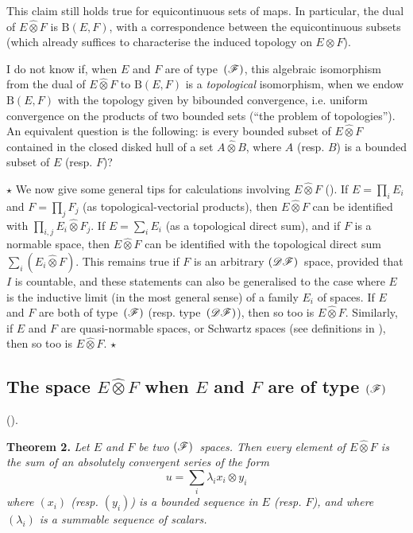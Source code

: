 \documentclass{article}
\theoremstyle{plain}
\newenvironment{itenv}[1]
  {\phantomsection\par\medskip\noindent\textbf{#1.}\itshape}
  {\medskip}
\newcommand{\aster}[1]{$\star${#1}$\star$}
\newcommand{\BB}{\mathrm{B}}
\newcommand{\DF}{\mbox{\normalfont($\mathscr{DF}$)}}
\newcommand{\FF}{\mbox{\normalfont($\mathscr{F}$)}}
\newcommand{\hotimes}{\widehat{\otimes}}
\newcommand{\oldpage}[1]{\marginpar{\footnotesize$\Big\vert$ \textit{p.~#1}}}
\begin{document}
This claim still holds true for equicontinuous sets of maps.
In particular, the dual of $E\hotimes F$ is $\BB(E,F)$, with a correspondence between the equicontinuous subsets (which already suffices to characterise the induced topology on $E\otimes F$).

I do not know if, when $E$ and $F$ are of type~$\FF$, this algebraic isomorphism from the dual of $E\hotimes F$ to $\BB(E,F)$ is a \emph{topological} isomorphism, when we endow $\BB(E,F)$ with the topology given by bibounded convergence, i.e. uniform convergence on the products of two bounded sets (``the problem of topologies'').
An equivalent question is the following:
is every bounded subset of $E\hotimes F$ contained in the closed disked hull of a set $A\hotimes B$, where $A$ (resp. $B$) is a bounded subset of $E$ (resp. $F$)?

\aster{
  We now give some general tips for calculations involving $E\hotimes F$ (\cite[chap.~I, \S1, n\textsuperscript{o}~3]{PTT}).
  If $E=\prod_i E_i$ and $F=\prod_j F_j$ (as topological-vectorial products), then $E\hotimes F$ can be identified with $\prod_{i,j}E_i\hotimes F_j$.
  If $E=\sum_i E_i$ (as a topological direct sum), and if $F$ is a normable space, then $E\hotimes F$ can be identified with the topological direct sum $\sum_i(E_i\hotimes F)$.
  This remains true if $F$ is an arbitrary $\DF$~space, provided that $I$ is countable, and these statements can also be generalised to the case where $E$ is the inductive limit (in the most general sense) of a family $E_i$ of spaces.
  If $E$ and $F$ are both of type~$\FF$ (resp. type~$\DF$), then so too is $E\hotimes F$.
  Similarly, if $E$ and $F$ are quasi-normable spaces, or Schwartz spaces (see definitions in \cite[\S3]{6}), then so too is $E\hotimes F$.
}

\oldpage{78}
\subsection{The space \texorpdfstring{$E\hotimes F$}{E(x)F} when \texorpdfstring{$E$}{E} and \texorpdfstring{$F$}{F} are of type \texorpdfstring{$\FF$}{(F)}}
\label{1.2}

(\cite[chap.~1, \S2, n\textsuperscript{o}~1]{PTT}).
\medskip

\begin{itenv}{Theorem 2}
\label{1.theorem2}
  Let $E$ and $F$ be two $\FF$~spaces.
  Then every element of $E\hotimes F$ is the sum of an absolutely convergent series of the form
  \[
    u = \sum_i \lambda_i x_i \otimes y_i
  \]
  where $(x_i)$ (resp. $(y_i)$) is a bounded sequence in $E$ (resp. $F$), and where $(\lambda_i)$ is a summable sequence of scalars.
\end{itenv}
\end{document}
